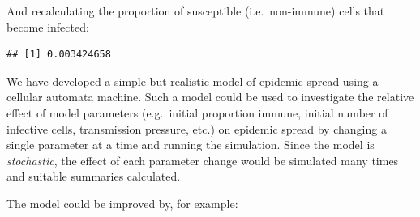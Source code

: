 \documentclass[12pt,a4paper]{book}
\newenvironment{Shaded}{\begin{snugshade}}{\end{snugshade}}
\newcommand{\KeywordTok}[1]{\textcolor[rgb]{0.13,0.29,0.53}{\textbf{#1}}}
\newcommand{\StringTok}[1]{\textcolor[rgb]{0.31,0.60,0.02}{#1}}
\newcommand{\OperatorTok}[1]{\textcolor[rgb]{0.81,0.36,0.00}{\textbf{#1}}}
\newcommand{\NormalTok}[1]{#1}
\theoremstyle{definition}
\theoremstyle{definition}
\theoremstyle{definition}
\theoremstyle{remark}
\begin{document}
And recalculating the proportion of susceptible (i.e.~non-immune) cells
that become infected:

\begin{Shaded}
\end{Shaded}

\begin{verbatim}
## [1] 0.003424658
\end{verbatim}

We have developed a simple but realistic model of epidemic spread using
a cellular automata machine. Such a model could be used to investigate
the relative effect of model parameters (e.g.~initial proportion immune,
initial number of infective cells, transmission pressure, etc.) on
epidemic spread by changing a single parameter at a time and running the
simulation. Since the model is \emph{stochastic}, the effect of each
parameter change would be simulated many times and suitable summaries
calculated.

The model could be improved by, for example:
\end{document}
